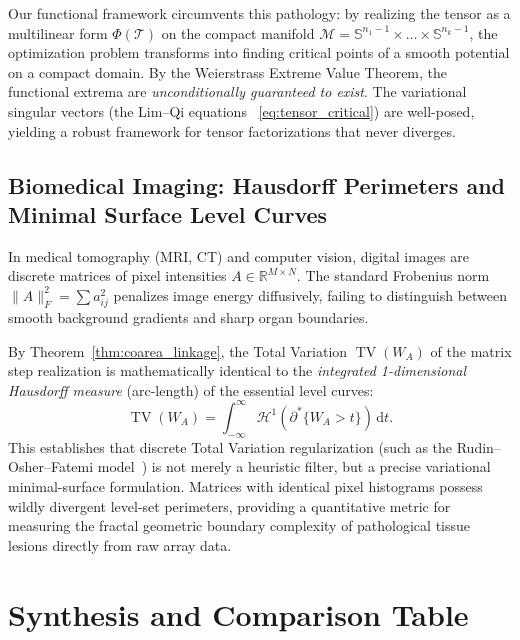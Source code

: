 \documentclass[11pt,a4paper,reqno]{amsart}
\theoremstyle{definition}
\numberwithin{equation}{section}
\providecommand{\R}{\mathbb{R}}
\providecommand{\Sph}{\mathbb{S}}
\providecommand{\TV}{\operatorname{TV}}
\newcommand{\dif}{\,\mathrm{d}}
\providecommand{\Sph}{\mathbb{S}}
\providecommand{\R}{\mathbb{R}}
\providecommand{\TV}{\mathrm{TV}}
\begin{document}
Our functional framework circumvents this pathology: by realizing the tensor as a multilinear form $\Phi(\mathcal{T})$ on the compact manifold $\mathcal{M} = \Sph^{n_1-1} \times \dots \times \Sph^{n_k-1}$, the optimization problem transforms into finding critical points of a smooth potential on a compact domain. By the Weierstrass Extreme Value Theorem, the functional extrema are \emph{unconditionally guaranteed to exist}. The variational singular vectors (the Lim--Qi equations~\cite{lim2005singular,qi2005eigenvalues} \eqref{eq:tensor_critical}) are well-posed, yielding a robust framework for tensor factorizations that never diverges.

\subsection{Biomedical Imaging: Hausdorff Perimeters and Minimal Surface Level Curves}
\label{subsec:imp_imaging}
In medical tomography (MRI, CT) and computer vision, digital images are discrete matrices of pixel intensities $A \in \R^{M \times N}$. The standard Frobenius norm $\|A\|_F^2 = \sum a_{ij}^2$ penalizes image energy diffusively, failing to distinguish between smooth background gradients and sharp organ boundaries.

By Theorem~\ref{thm:coarea_linkage}, the Total Variation $\TV(W_A)$ of the matrix step realization is mathematically identical to the \emph{integrated 1-dimensional Hausdorff measure} (arc-length) of the essential level curves:
\begin{equation}
    \TV(W_A) = \int_{-\infty}^\infty \mathcal{H}^1(\partial^* \{W_A > t\}) \dif t.
\end{equation}
This establishes that discrete Total Variation regularization (such as the Rudin--Osher--Fatemi model~\cite{rudin1992nonlinear}) is not merely a heuristic filter, but a precise variational minimal-surface formulation. Matrices with identical pixel histograms possess wildly divergent level-set perimeters, providing a quantitative metric for measuring the fractal geometric boundary complexity of pathological tissue lesions directly from raw array data.

\section{Synthesis and Comparison Table}
\label{sec:synthesis}
\end{document}
